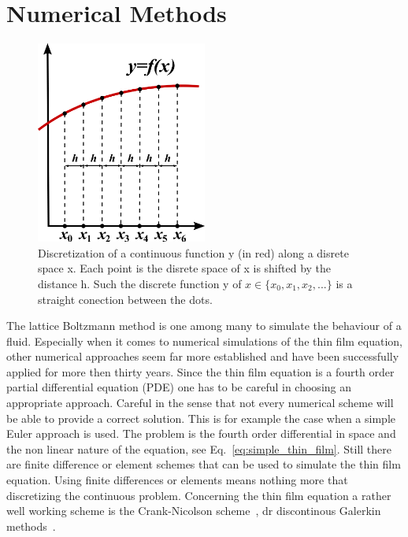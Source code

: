 \section{Numerical Methods}\label{sec:numerical_methods}
\begin{figure}
    \centering
    \includegraphics[width=0.5\textwidth]{graphics/800px-Finite_Differences.svg.png}
    \caption{Discretization of a continuous function y (in red) along a disrete space x.
    Each point is the disrete space of x is shifted by the distance h.
    Such the discrete function y of $x\in\{x_0, x_1, x_2, ...\}$ is a straight conection between the dots.}
    \label{fig:finite_difference}
\end{figure}
The lattice Boltzmann method is one among many to simulate the behaviour of a fluid.
Especially when it comes to numerical simulations of the thin film equation, other numerical approaches seem far more established and have been successfully applied for more then thirty years.
Since the thin film equation is a fourth order partial differential equation (PDE) one has to be careful in choosing an appropriate approach.
Careful in the sense that not every numerical scheme will be able to provide a correct solution.
This is for example the case when a simple Euler approach is used.
The problem is the fourth order differential in space and the non linear nature of the equation, see Eq.~\ref{eq:simple_thin_film}.
Still there are finite difference or element schemes that can be used to simulate the thin film equation.
Using finite differences or elements means nothing more that discretizing the continuous problem.
Concerning the thin film equation a rather well working scheme is the Crank-Nicolson scheme~\cite{crank_nicolson_1947, PhysRevE.63.011208, 10.5555/1403886}, dr discontinous Galerkin methods~\cite{ern2013theory}.

